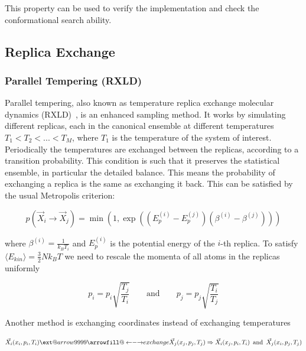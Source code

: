\documentclass[a4paper]{article}
\makeatletter
\newcommand\xleftrightarrow[2][]{%
  \ext@arrow 9999{\longleftrightarrowfill@}{#1}{#2}}
\newcommand\longleftrightarrowfill@{%
  \arrowfill@\leftarrow\relbar\rightarrow}
\makeatother
\begin{document}
This property can be used to verify the implementation and check the conformational search ability.

\subsection{Replica Exchange}

\subsubsection{Parallel Tempering (RXLD)}

Parallel tempering, also known as temperature replica exchange molecular dynamics (RXLD)~\cite{YujiSugita1999}, is an enhanced sampling method. It works by simulating different replicas, each in the canonical ensemble at different temperatures $T_1 < T_2 < ... < T_M$, where $T_1$ is the temperature of the system of interest. Periodically the temperatures are exchanged between the replicas, according to a transition probability. This condition is such that it preserves the statistical ensemble, in particular the detailed balance. This means the probability of exchanging a replica is the same as exchanging it back. This can be satisfied by the usual Metropolis criterion:

\begin{equation}
p \left( \vec{X}_i \rightarrow \vec{X}_j \right) = \min \left( 1, \exp \left( \left( E_p^{(i)} - E_p^{(j)} \right)  \left( \beta^{(i)} - \beta^{(j)} \right)  \right) \right)
\label{eq:parallel}
\end{equation}

where $\beta^{(i)} = \frac{1}{k_B T_i}$ and $E_p^{(i)}$ is the potential energy of the $i$-th replica. To satisfy $\langle E_{kin} \rangle = \frac{3}{2} N k_B T$ we need to rescale the momenta of all atoms in the replicas uniformly

\begin{equation}
p_i = p_i \sqrt{\frac{T_j}{T_i}} \qquad \text{and} \qquad p_j = p_j \sqrt{\frac{T_i}{T_j}}
\end{equation}

Another method is exchanging coordinates instead of exchanging temperatures

\begin{equation}
\vec{X}_i(x_i, p_i, T_i) \xleftrightarrow{exchange} \vec{X}_j(x_j, p_j, T_j) \Rightarrow \vec{X}_i(x_j, p_i, T_i) \enspace \text{and} \enspace \vec{X}_j(x_i, p_j, T_j)
\end{equation}
\end{document}
